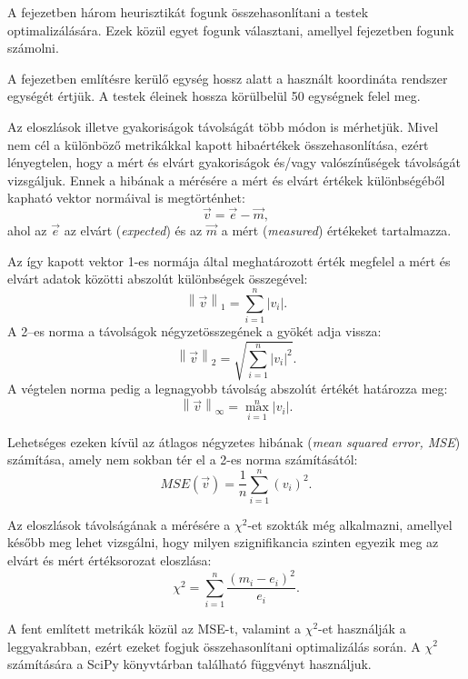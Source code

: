 
A fejezetben három heurisztikát fogunk összehasonlítani a testek optimalizálására.
Ezek közül egyet fogunk választani, amellyel  fejezetben fogunk számolni.

A fejezetben említésre kerülő egység hossz alatt a használt koordináta rendszer egységét értjük.
A testek éleinek hossza körülbelül 50 egységnek felel meg.


Az eloszlások illetve gyakoriságok távolságát több módon is mérhetjük.
Mivel nem cél a különböző metrikákkal kapott hibaértékek összehasonlítása, ezért lényegtelen, hogy a mért és elvárt gyakoriságok és/vagy valószínűségek távolságát vizsgáljuk.
Ennek a hibának a mérésére a mért és elvárt értékek különbségéből kapható vektor normáival is megtörténhet:
\[
\vec{v} = \vec{e} - \vec{m},
\]
ahol az $\vec{e}$ az elvárt (\textit{expected}) és az $\vec{m}$ a mért (\textit{measured}) értékeket tartalmazza.

Az így kapott vektor 1-es normája által meghatározott érték megfelel a mért és elvárt adatok közötti abszolút különbségek összegével:
\[
\left\lVert\vec{v}\right\rVert_1 = \sum\limits_{i=1}^{n} |v_i|.
\]
A 2--es norma a távolságok négyzetösszegének a gyökét adja vissza:
\[
\left\lVert\vec{v}\right\rVert_2 = \sqrt{\sum\limits_{i=1}^{n} |v_i|^2}.
\]
A végtelen norma pedig a legnagyobb távolság abszolút értékét határozza meg:
\[
\left\lVert\vec{v}\right\rVert_\infty = \max\limits_{i=1}^{n} |v_i|.
\]

Lehetséges ezeken kívül az átlagos négyzetes hibának (\textit{mean squared error, MSE}) számítása, amely nem sokban tér el a 2-es norma számításától:
\[
MSE(\vec{v}) = \frac{1}{n} \sum_{i=1}^{n}(v_i)^2.
\]

Az eloszlások távolságának a mérésére a $\chi^2$-et szokták még alkalmazni, amellyel később meg lehet vizsgálni, hogy milyen szignifikancia szinten egyezik meg az elvárt és mért értéksorozat eloszlása:
\[
\chi^2=\sum_{i=1}^{n} \frac{(m_i - e_i)^2}{e_i}.
\]

A fent említett metrikák közül az MSE-t, valamint a $\chi^2$-et használják a leggyakrabban, ezért ezeket fogjuk összehasonlítani optimalizálás során.
A $\chi^2$ számítására a SciPy \cite{2020SciPy-NMeth} könyvtárban található függvényt használjuk.


